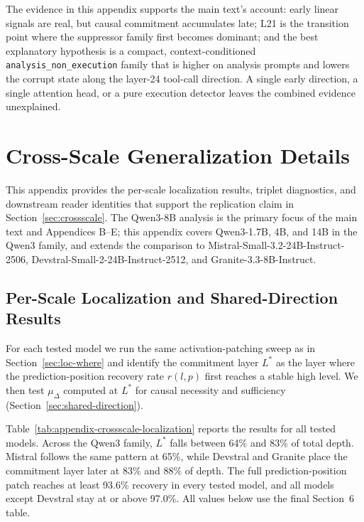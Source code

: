 The evidence in this appendix supports the main text's account: early linear
signals are real, but causal commitment accumulates late; L21 is the
transition point where the suppressor family first becomes dominant; and the
best explanatory hypothesis is a compact, context-conditioned
\texttt{analysis\_non\_execution} family that is higher on analysis prompts and
lowers the corrupt state along the layer-24 tool-call direction. A single
early direction, a single attention head, or a pure execution detector leaves
the combined evidence unexplained.

\section{Cross-Scale Generalization Details}
\label{appendix:cross-scale}
This appendix provides the per-scale localization results, triplet diagnostics,
and downstream reader identities that support the replication claim in
Section~\ref{sec:crossscale}. The Qwen3-8B analysis is the primary focus of
the main text and Appendices B--E; this appendix covers Qwen3-1.7B, 4B, and
14B in the Qwen3 family, and extends the comparison to
Mistral-Small-3.2-24B-Instruct-2506, Devstral-Small-2-24B-Instruct-2512, and
Granite-3.3-8B-Instruct.

\subsection{Per-Scale Localization and Shared-Direction Results}
\label{appendix:cross-scale:localization}

For each tested model we run the same activation-patching sweep as in
Section~\ref{sec:loc-where} and identify the commitment layer $L^*$ as the
layer where the prediction-position recovery rate $r(l,p)$ first reaches a
stable high level. We then test $\mu_\Delta$ computed at $L^*$ for causal
necessity and sufficiency (Section~\ref{sec:shared-direction}).

Table~\ref{tab:appendix-crossscale-localization} reports the results for all
tested models. Across the Qwen3 family, $L^*$ falls between 64\% and 83\% of
total depth. Mistral follows the same pattern at 65\%, while Devstral and
Granite place the commitment layer later at 83\% and 88\% of depth. The full
prediction-position patch reaches at least 93.6\% recovery in every tested
model, and all models except Devstral stay at or above 97.0\%. All values
below use the final Section~6 table.

